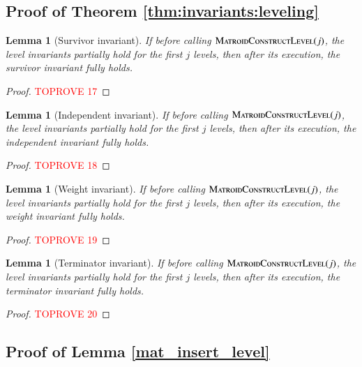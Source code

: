\documentclass[11pt]{article}
\newtheorem{lemma}[theorem]{Lemma}
\newcommand{\MatroidConstLevel}{\textsc{MatroidConstructLevel}}
\begin{document}
\subsection{Proof of Theorem \ref{thm:invariants:leveling}}
\label{subs:thm:invariants:levelin}
\begin{lemma}[Survivor invariant]
\label{lm:survivor:leveling}
If before calling $\MatroidConstLevel{}(j)$, the level invariants partially hold for the first $j$ levels,
then after its execution, the survivor invariant fully holds.
\end{lemma}


\begin{proof}\textcolor{red}{TOPROVE 17}\end{proof}






\begin{lemma}[Independent invariant]
\label{lm:independent:leveling}
If before calling $\MatroidConstLevel{}(j)$, the level invariants partially hold for the first $j$ levels,
then after its execution, the independent invariant fully holds. 
\end{lemma}

\begin{proof}\textcolor{red}{TOPROVE 18}\end{proof}



\begin{lemma}[Weight invariant]
\label{lm:weight:leveling}
If before calling $\MatroidConstLevel{}(j)$, the level invariants partially hold for the first $j$ levels,
then after its execution, the weight invariant fully holds. 
\end{lemma}

\begin{proof}\textcolor{red}{TOPROVE 19}\end{proof}
\begin{lemma}[Terminator invariant]
\label{lm:terminator:leveling}
If before calling $\MatroidConstLevel{}(j)$, the level invariants partially hold for the first $j$ levels,
then after its execution, the terminator invariant fully holds. 
\end{lemma}

\begin{proof}\textcolor{red}{TOPROVE 20}\end{proof}


\subsection{Proof of Lemma \ref{mat_insert_level}}
\label{subs:mat_insert_level}
\end{document}
